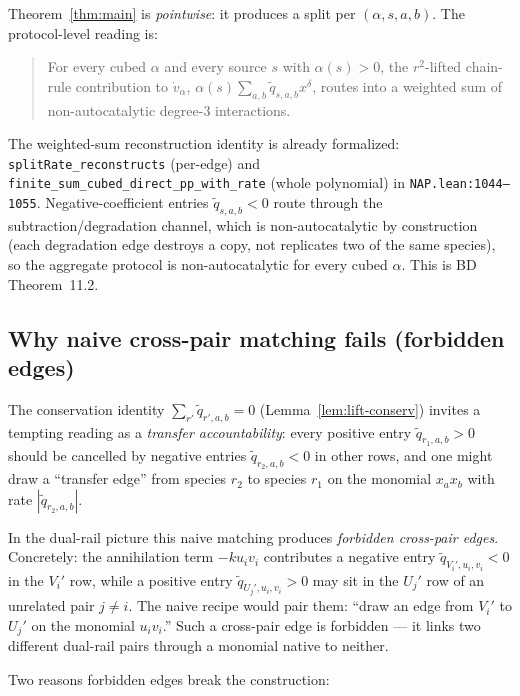\documentclass[11pt]{article}
\begin{document}
Theorem~\ref{thm:main} is \emph{pointwise}: it produces a split per
$(\alpha, s, a, b)$. The protocol-level reading is:
\begin{quote}
  For every cubed $\alpha$ and every source $s$ with $\alpha(s) > 0$,
  the $r^2$-lifted chain-rule contribution to $\dot v_\alpha$,
  $\alpha(s) \sum_{a, b} \widetilde q_{s,a,b} x^\delta$, routes into a
  weighted sum of non-autocatalytic degree-$3$ interactions.
\end{quote}
The weighted-sum reconstruction identity is already formalized:
\texttt{splitRate\_reconstructs} (per-edge) and
\texttt{finite\_sum\_cubed\_direct\_pp\_with\_rate} (whole polynomial)
in \texttt{NAP.lean:1044--1055}. Negative-coefficient entries
$\widetilde q_{s, a, b} < 0$ route through the subtraction/degradation
channel, which is non-autocatalytic by construction (each degradation
edge destroys a copy, not replicates two of the same species), so the
aggregate protocol is non-autocatalytic for every cubed $\alpha$.
This is BD Theorem~11.2.

\subsection{Why naive cross-pair matching fails (forbidden edges)}
\label{sec:forbidden}

The conservation identity $\sum_{r'} \widetilde q_{r', a, b} = 0$
(Lemma~\ref{lem:lift-conserv}) invites a tempting reading as a
\emph{transfer accountability}: every positive entry
$\widetilde q_{r_1, a, b} > 0$ should be cancelled by negative entries
$\widetilde q_{r_2, a, b} < 0$ in other rows, and one might draw a
``transfer edge'' from species $r_2$ to species $r_1$ on the monomial
$x_a x_b$ with rate $|\widetilde q_{r_2, a, b}|$.

In the dual-rail picture this naive matching produces \emph{forbidden
cross-pair edges}. Concretely: the annihilation term $-k u_i v_i$
contributes a negative entry $\widetilde q_{V_i', u_i, v_i} < 0$ in the
$V_i'$ row, while a positive entry $\widetilde q_{U_j', u_i, v_i} > 0$
may sit in the $U_j'$ row of an unrelated pair $j \ne i$. The naive
recipe would pair them: ``draw an edge from $V_i'$ to $U_j'$ on the
monomial $u_i v_i$.'' Such a cross-pair edge is forbidden — it links
two different dual-rail pairs through a monomial native to neither.

Two reasons forbidden edges break the construction:
\end{document}
